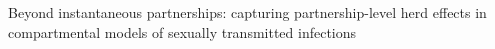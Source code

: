 Beyond instantaneous partnerships:
capturing partnership-level herd effects
in compartmental models of sexually transmitted infections